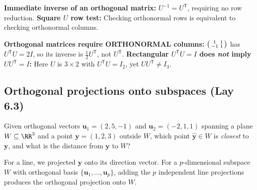 \documentclass[10pt]{scrartcl}
\newcommand{\vv}[1]{\mathbf{#1}}
\begin{document}
\begin{shortcuts}
  \ii \textbf{Immediate inverse of an orthogonal matrix:} $U^{-1}=U^{\mathsf T}$, requiring no row reduction.
  \ii \textbf{Square $U$ row test:} Checking orthonormal rows is equivalent to checking orthonormal columns.
\end{shortcuts}

\begin{trapbox}
  \ii \textbf{Orthogonal matrices require ORTHONORMAL columns:} $\begin{psmallmatrix}1&1\\-1&1\end{psmallmatrix}$ has $U^{\mathsf T}U=2I$, so its inverse is $\frac12 U^{\mathsf T}$, not $U^{\mathsf T}$.
  \ii \textbf{Rectangular $U^{\mathsf T}U=I$ does \emph{not} imply $UU^{\mathsf T}=I$:} Here $U$ is $3\times2$ with $U^{\mathsf T}U=I_2$, yet $UU^{\mathsf T}\neq I_3$.
\end{trapbox}

\subsection{Orthogonal projections onto subspaces (Lay 6.3)}

\begin{qbox}
  Given orthogonal vectors $\vv u_1=(2,5,-1)$ and $\vv u_2=(-2,1,1)$ spanning a plane $W\subseteq\RR^3$ and a point $\vv y=(1,2,3)$ outside $W$, which point $\hat{\vv y}\in W$ is \emph{closest} to $\vv y$, and what is the distance from $\vv y$ to $W$?
\end{qbox}

For a line, we projected $\vv y$ onto its direction vector. For a $p$-dimensional subspace $W$ with orthogonal basis $\{\vv u_1,\dots,\vv u_p\}$, adding the $p$ independent line projections produces the orthogonal projection onto $W$.
\end{document}
